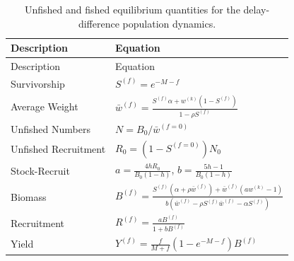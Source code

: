 \documentclass[]{article}
\begin{document}
\begin{longtable}[]{@{}ll@{}}
\caption{\label{tab:ddEqbmTable}Unfished and fished equilibrium quantities for the delay-difference population dynamics.}\tabularnewline
\toprule
Description & Equation\tabularnewline
\midrule
\endfirsthead
\toprule
Description & Equation\tabularnewline
\midrule
\endhead
Survivorship & \(S^{(f)} = e^{- M - f}\)\tabularnewline
Average Weight & \(\bar{w}^{(f)} = \frac{S^{(f)}\alpha + w^{(k)}(1 - S^{(f)})}{1 - \rho S^{(f)}}\)\tabularnewline
Unfished Numbers & \(N = B_{0} / \bar{w}^{(f=0)}\)\tabularnewline
Unfished Recruitment & \(R_{0} = (1 - S^{(f=0)})N_{0}\)\tabularnewline
Stock-Recruit & \(a = \frac{4hR_{0}}{B_{0}(1 - h)}\), \(b = \frac{5h - 1}{B_{0}(1 - h)}\)\tabularnewline
Biomass & \(B^{(f)} = \frac{ S^{(f)}(\alpha + \rho\bar{w}^{(f)}) + \bar{w}^{(f)}(aw^{(k)}-1)} {b(\bar{w}^{(f)} - \rho S^{(f)}\bar{w}^{(f)} - \alpha S^{(f)})}\)\tabularnewline
Recruitment & \(R^{(f)} = \frac{aB^{(f)}}{1+bB^{(f)}}\)\tabularnewline
Yield & \(Y^{(f)} = \frac{f}{M + f} (1 - e^{-M-f}) B^{(f)}\)\tabularnewline
\bottomrule
\end{longtable}

\newpage
\end{document}
